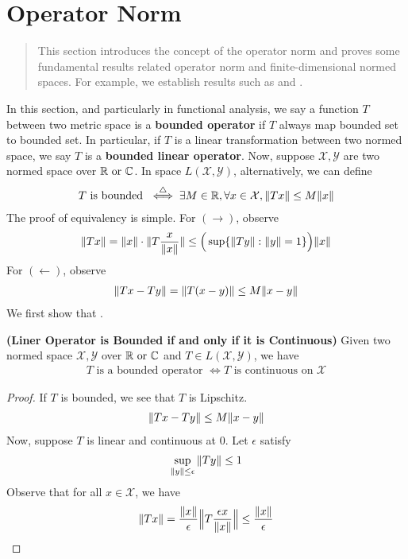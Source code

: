 \documentclass{report}
\begin{document}
\section{Operator Norm}
\begin{abstract}
This section introduces the concept of the operator norm and proves some fundamental results related operator norm and finite-dimensional normed spaces. For example, we establish results such as  and .
\end{abstract}
\begin{mdframed}
In this section, and particularly in functional analysis, we say a function $T$ between two metric space is a  \textbf{bounded operator} if $T$ always map bounded set to bounded set. In particular, if $T$ is a linear transformation between two normed space, we say $T$ is a \textbf{bounded linear operator}. Now, suppose $\mathcal{X},\mathcal{Y}$ are two normed space over $\mathbb{R}\text{ or }\mathbb{C}$. In space $L(\mathcal{X},\mathcal{Y})$, alternatively, we can define 
\begin{align*}
T\text{ is bounded } \overset{\triangle}{\iff} \exists M\in\mathbb{R},\forall x\in \mathcal{X}, \| Tx \|\leq M\| x \|
\end{align*}
The proof of equivalency is simple. For $(\longrightarrow )$, observe 
\begin{align*}
\| Tx \|= \| x \|\cdot\| T \frac{x}{\| x \|} \|\leq \Big(\sup \{ \| Ty \|:\| y \|=1 \} \Big)\| x \|
\end{align*}
For $(\longleftarrow)$, observe 
\begin{align*}
\| Tx-Ty \|=\| T(x-y) \|\leq M \| x-y \|
\end{align*}
We first show that . 
\end{mdframed}
\begin{theorem}
\label{LOB}
\textbf{(Liner Operator is Bounded if and only if it is Continuous)} Given two normed space $\mathcal{X},\mathcal{Y}$ over $\mathbb{R}\text{ or }\mathbb{C}$ and  $T\in L(\mathcal{X},\mathcal{Y})$, we have 
\begin{align*}
T\text{ is a bounded operator }\iff T\text{ is continuous on $\mathcal{X}$}
\end{align*}
\end{theorem}
\begin{proof}
If $T$ is bounded, we see that $T$ is Lipschitz. 
\begin{align*}
\| Tx-Ty \|\leq M \| x-y \|
\end{align*}
Now, suppose $T$ is linear and continuous at $0$. Let $\epsilon $ satisfy 
\begin{align*}
\sup_{\| y \|\leq \epsilon } \| Ty \| \leq 1
\end{align*}
Observe that for all $x \in \mathcal{X}$, we have
\begin{align*}
\| Tx \|= \frac{\| x \|}{\epsilon } \Big\| T \frac{\epsilon x}{\| x \|} \Big\|\leq \frac{\| x \|}{\epsilon}
\end{align*}
\end{proof}
\end{document}
